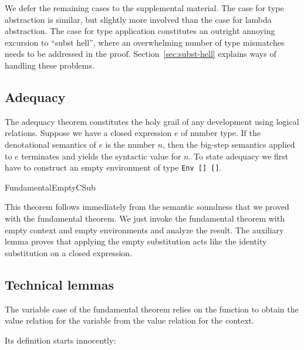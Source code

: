 \documentclass[acmsmall,anonymous,review,screen]{acmart}
\begin{document}
We defer the remaining cases to the supplemental material.
The case for type abstraction is similar, but slightly more involved than the case
for lambda abstraction.
The case for type application constitutes an outright annoying
excursion to ``subst hell'', where an overwhelming number of type
mismatches needs to be addressed in the proof. Section~\ref{sec:subst-hell} explains
ways of handling these problems.

\subsection{Adequacy}
\label{sec:adequacy}

The adequacy theorem constitutes the holy grail of any development
using logical relations.
Suppose we have a closed expression $e$ of number type.
If the denotational semantics of $e$ is the number $n$, then the big-step
semantics applied to $e$ terminates and yields the syntactic value for
$n$.
To state adequacy we first have to construct an empty
environment of type \texttt{Env [] {\Anull} []}.
\begin{minipage}{0.3\linewidth}
  \FundamentalEmptyEnv
\end{minipage}
\begin{minipage}{0.3\linewidth}
  \FundamentalEmptyRelEnv
\end{minipage}
\begin{minipage}{0.3\linewidth}
  FundamentalEmptyCSub
\end{minipage}
\FundamentalAdequacyType
This theorem follows immediately from the semantic soundness that we proved with the
fundamental theorem.
\FundamentalAdequacyBody
We just invoke the fundamental theorem with empty context and empty
environments and analyze the result. The auxiliary lemma
{\ACsubClosed} proves that applying the empty substitution acts like
the identity substitution on a closed expression.
\FundamentalCsubClosed


\subsection{Technical lemmas}
\label{sec:technical-lemmas}

The variable case of the fundamental theorem relies on the function
{\AGLookup} to obtain the value relation for the variable from the
value relation for the context. 
\LRVrenMCGLookupType

Its definition starts innocently:
\LRVrenMCGLookupBody
\end{document}
